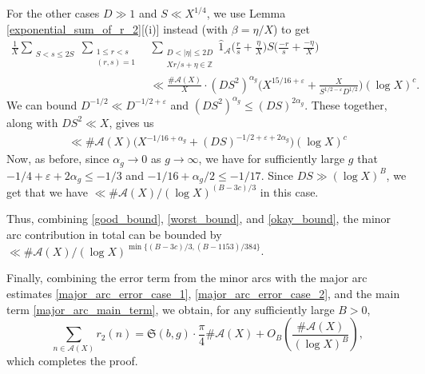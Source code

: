 \documentclass[12pt]{amsart}
\theoremstyle{definition}
\theoremstyle{definition}
\theoremstyle{remark}
\numberwithin{equation}{section}
\newcommand{\Z}{\mathbb{Z}}
\newcommand{\CA}{\mathcal{A}}
\renewcommand{\leq}{\leqslant}
\renewcommand{\hat}{\widehat}
\begin{document}
For the other cases $D\gg 1$ and $S\ll X^{1/4}$, we use Lemma \ref{exponential_sum_of_r_2}[(i)] instead (with $\beta=\eta/X$) to get
\begin{align*}
\frac{1}{X} \sum_{\substack{S<s\leq 2S}}\sum_{\substack{1 \leq r < s  \\ (r,s)=1}} &\sum_{\substack{D<|\eta| \leq 2D \\ Xr/s+\eta\in \Z}} \hat{1}_{\CA}\bigg(\frac{r}{s}+ \frac{\eta}{X}\bigg) S\bigg(\frac{-r}{s} + \frac{-\eta}{X}\bigg) \\
&\ll \frac{\#\CA(X)}{X} \cdot (DS^2)^{\alpha_g} \bigg(X^{15/16+\varepsilon} + \frac{X}{S^{1/2-\varepsilon}D^{1/2}} \bigg) (\log X)^c.
\end{align*}
We can bound $D^{-1/2} \ll D^{-1/2+\varepsilon}$ and $(DS^2)^{\alpha_g} \leq (DS)^{2\alpha_g}$. These together, along with $DS^2 \ll X$, gives us
\begin{align}
\ll \#\CA(X) \bigg( X^{-1/16+\alpha_g} + (DS)^{-1/2+\varepsilon + 2\alpha_g} \bigg) (\log X)^c \label{okay_bound}
\end{align}
Now, as before, since $\alpha_g \to 0$ as $g\to\infty$, we have for sufficiently large $g$ that $-1/4 +\varepsilon +2\alpha_g \leq -1/3$ and $-1/16 + \alpha_g/2 \leq -1/17$. Since $DS\gg (\log X)^B$, we get that we have $\ll \#\CA(X) /(\log X)^{(B-3c)/3}$ in this case. 

Thus, combining \eqref{good_bound}, \eqref{worst_bound}, and \eqref{okay_bound}, the minor arc contribution in total can be bounded by $\ll \#\CA(X)/(\log X)^{\min\{(B-3c)/3,(B-1153)/384\}}$.



Finally, combining the error term from the minor arcs with the major arc estimates \eqref{major_arc_error_case_1}, \eqref{major_arc_error_case_2}, and the main term \eqref{major_arc_main_term}, we obtain, for any sufficiently large $B>0$,
$$ \sum_{n\in \CA(X)} r_2(n) = \mathfrak{S}(b,g)\cdot\frac{\pi}{4}\#\CA(X) + O_B \left(\frac{\#\CA(X)}{(\log X)^B}\right), $$
which completes the proof.
\end{document}
